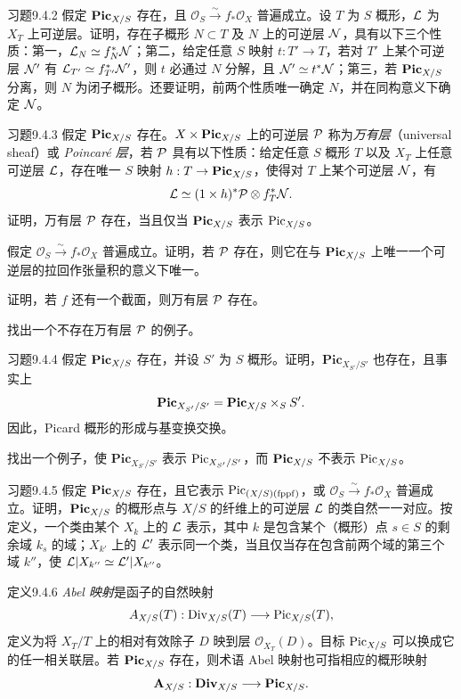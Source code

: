 \begin{origstatement}{习题}{9.4.2}\label{ch09s04:9.4.2}
假定 $\mathbf{Pic}_{X/S}$ 存在，且 $\mathcal O_S\xrightarrow{\sim}f_*\mathcal O_X$ 普遍成立。设 $T$ 为 $S$ 概形，$\mathcal L$ 为 $X_T$ 上可逆层。证明，存在子概形 $N\subset T$ 及 $N$ 上的可逆层 $\mathcal N$，具有以下三个性质：第一，$\mathcal L_N\simeq f_N^*\mathcal N$；第二，给定任意 $S$ 映射 $t:T'\to T$，若对 $T'$ 上某个可逆层 $\mathcal N'$ 有 $\mathcal L_{T'}\simeq f_{T'}^*\mathcal N'$，则 $t$ 必通过 $N$ 分解，且 $\mathcal N'\simeq t^*\mathcal N$；第三，若 $\mathbf{Pic}_{X/S}$ 分离，则 $N$ 为闭子概形。还要证明，前两个性质唯一确定 $N$，并在同构意义下确定 $\mathcal N$。
\end{origstatement}
\begin{origstatement}{习题}{9.4.3}\label{ch09s04:9.4.3}
假定 $\mathbf{Pic}_{X/S}$ 存在。$X\times\mathbf{Pic}_{X/S}$ 上的可逆层 $\mathcal P$ 称为\emph{万有层}（universal sheaf）或 \emph{Poincaré 层}，若 $\mathcal P$ 具有以下性质：给定任意 $S$ 概形 $T$ 以及 $X_T$ 上任意可逆层 $\mathcal L$，存在唯一 $S$ 映射 $h:T\to\mathbf{Pic}_{X/S}$，使得对 $T$ 上某个可逆层 $\mathcal N$，有
\[
\mathcal L\simeq(1\times h)^*\mathcal P\otimes f_T^*\mathcal N.
\]
证明，万有层 $\mathcal P$ 存在，当且仅当 $\mathbf{Pic}_{X/S}$ 表示 $\operatorname{Pic}_{X/S}$。

假定 $\mathcal O_S\xrightarrow{\sim}f_*\mathcal O_X$ 普遍成立。证明，若 $\mathcal P$ 存在，则它在与 $\mathbf{Pic}_{X/S}$ 上唯一一个可逆层的拉回作张量积的意义下唯一。

证明，若 $f$ 还有一个截面，则万有层 $\mathcal P$ 存在。

找出一个不存在万有层 $\mathcal P$ 的例子。
\end{origstatement}
\begin{origstatement}{习题}{9.4.4}\label{ch09s04:9.4.4}
假定 $\mathbf{Pic}_{X/S}$ 存在，并设 $S'$ 为 $S$ 概形。证明，$\mathbf{Pic}_{X_{S'}/S'}$ 也存在，且事实上
\[
\mathbf{Pic}_{X_{S'}/S'}=\mathbf{Pic}_{X/S}\times_S S'.
\]
因此，Picard 概形的形成与基变换交换。

找出一个例子，使 $\mathbf{Pic}_{X_{S'}/S'}$ 表示 $\operatorname{Pic}_{X_{S'}/S'}$，而 $\mathbf{Pic}_{X/S}$ 不表示 $\operatorname{Pic}_{X/S}$。
\end{origstatement}
\begin{origstatement}{习题}{9.4.5}\label{ch09s04:9.4.5}
假定 $\mathbf{Pic}_{X/S}$ 存在，且它表示 $\operatorname{Pic}_{(X/S)(\mathrm{fppf})}$，或 $\mathcal O_S\xrightarrow{\sim}f_*\mathcal O_X$ 普遍成立。证明，$\mathbf{Pic}_{X/S}$ 的概形点与 $X/S$ 的纤维上的可逆层 $\mathcal L$ 的类自然一一对应。按定义，一个类由某个 $X_k$ 上的 $\mathcal L$ 表示，其中 $k$ 是包含某个（概形）点 $s\in S$ 的剩余域 $k_s$ 的域；$X_{k'}$ 上的 $\mathcal L'$ 表示同一个类，当且仅当存在包含前两个域的第三个域 $k''$，使 $\mathcal L|X_{k''}\simeq\mathcal L'|X_{k''}$。
\end{origstatement}
\begin{origstatement}{定义}{9.4.6}\label{ch09s04:9.4.6}
\emph{Abel 映射}是函子的自然映射
\[
A_{X/S}(T):\operatorname{Div}_{X/S}(T)\longrightarrow\operatorname{Pic}_{X/S}(T),
\]
定义为将 $X_T/T$ 上的相对有效除子 $D$ 映到层 $\mathcal O_{X_T}(D)$。目标 $\operatorname{Pic}_{X/S}$ 可以换成它的任一相关联层。若 $\mathbf{Pic}_{X/S}$ 存在，则术语 Abel 映射也可指相应的概形映射
\[
\mathbf A_{X/S}:\mathbf{Div}_{X/S}\longrightarrow\mathbf{Pic}_{X/S}.
\]
\end{origstatement}

